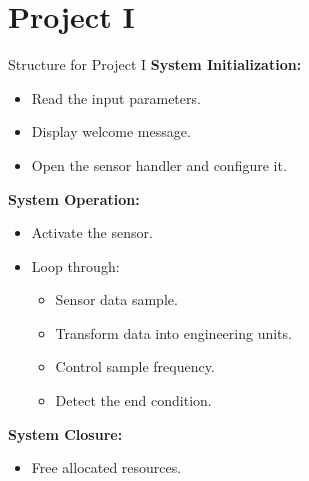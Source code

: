 \section{Project I}
\begin{frame}{Structure for Project I}
    \textbf{System Initialization:}
    \begin{itemize}
        \item Read the input parameters.
        \item Display welcome message.
        \item Open the sensor handler and configure it.
    \end{itemize}
    \textbf{System Operation:}
    \begin{itemize}
        \item Activate the sensor.
        \item Loop through:
        \begin{itemize}
            \item Sensor data sample.
            \item Transform data into engineering units.
            \item Control sample frequency.
            \item Detect the end condition.
        \end{itemize}
    \end{itemize}
    \textbf{System Closure:}
    \begin{itemize}
        \item Free allocated resources.
    \end{itemize}
\end{frame}


